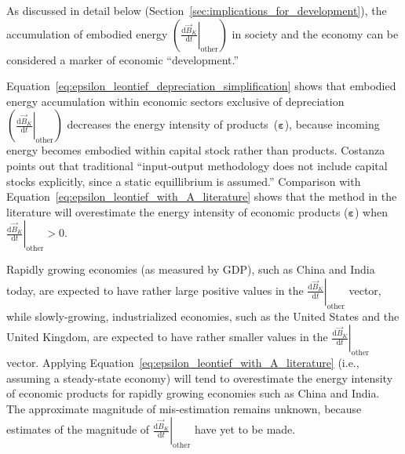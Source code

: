 As discussed in detail below (Section~\ref{sec:implications_for_development}),
the accumulation of embodied energy 
$\left( \left. \frac{\mathrm{d}\vec{B}_{K}}{\mathrm{d}t} \right|_{\mathrm{other}} \right)$
in society and the economy
can be considered a marker of economic ``development.''


Equation~\ref{eq:epsilon_leontief_depreciation_simplification} 
shows that embodied energy accumulation within economic sectors 
exclusive of depreciation
$\left( \left. \frac{\mathrm{d}\vec{B}_{K}}{\mathrm{d}t} \right|_{\mathrm{other}} \right)$ 
decreases the energy intensity of products~($\boldsymbol{\varepsilon}$),
because incoming energy becomes embodied within capital stock rather than products.
Costanza points out that traditional
``input-output methodology does not include capital stocks explicitly, 
since a static equillibrium is assumed.''\cite{Costanza:1980ww}
Comparison with Equation~\ref{eq:epsilon_leontief_with_A_literature}
shows that the method in the literature will overestimate the energy intensity
of economic products ($\boldsymbol{\varepsilon}$) when 
$\left. \frac{\mathrm{d}\vec{B}_{K}}{\mathrm{d}t} \right|_{\mathrm{other}} > 0$.

Rapidly growing economies (as measured by GDP), such as China and India today,
are expected to have rather large positive values in the  
$\left. \frac{\mathrm{d}\vec{B}_{K}}{\mathrm{d}t} \right|_{\mathrm{other}}$ vector,
while slowly-growing, industrialized economies, 
such as the United States and the United Kingdom,
are expected to have rather smaller values in the 
$\left. \frac{\mathrm{d}\vec{B}_{K}}{\mathrm{d}t} \right|_{\mathrm{other}}$ vector.
Applying Equation~\ref{eq:epsilon_leontief_with_A_literature} 
(i.e., assuming a steady-state economy)
will tend to overestimate the energy intensity 
of economic products for rapidly growing economies such as China and India.
The approximate magnitude of mis-estimation remains unknown, because
estimates of the magnitude of
$\left. \frac{\mathrm{d}\vec{B}_{K}}{\mathrm{d}t} \right|_{\mathrm{other}}$
have yet to be made.

